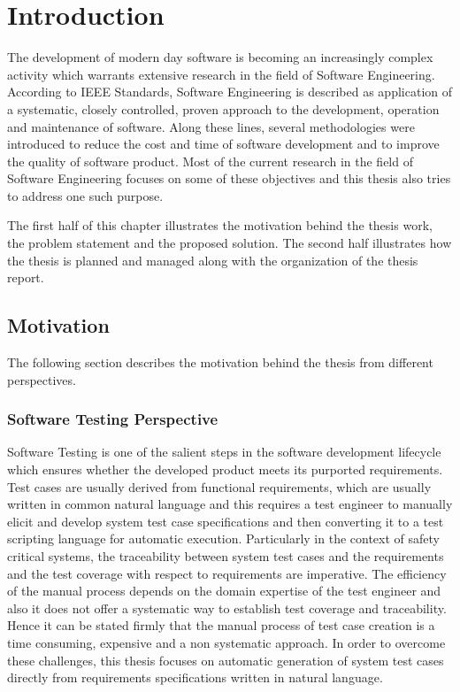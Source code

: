 
\chapter{Introduction}
The development of modern day software is becoming an increasingly complex activity which warrants extensive research in the field of Software Engineering. According to IEEE Standards, Software Engineering is described as application of a systematic, closely controlled, proven approach to the development, operation and maintenance of software. Along these lines, several methodologies were introduced to reduce the cost and time of software development and to improve the quality of software product. Most of the current research in the field of Software Engineering focuses on some of these objectives and this thesis also tries to address one such purpose.

The first half of this chapter illustrates the motivation behind the thesis work, the problem statement and the proposed solution. The second half illustrates how the thesis is planned and managed along with the organization of the thesis report.
\section{Motivation}
The following section describes the motivation behind the thesis from different perspectives.
\subsection{Software Testing Perspective}
Software Testing is one of the salient steps in the software development lifecycle which ensures whether the developed product meets its purported requirements. Test cases are usually derived from functional requirements, which are usually written in common natural language and this requires a test engineer to manually elicit and develop system test case specifications and then converting it to a test scripting language for automatic execution. Particularly in the context of safety critical systems, the traceability between system test cases and the requirements and the test coverage with respect to requirements are imperative. The efficiency of the manual process depends on the domain expertise of the test engineer and also it does not offer a systematic way to establish test coverage and traceability. Hence it can be stated firmly that the manual process of test case creation is a time consuming, expensive and a non systematic approach. In order to overcome these challenges, this thesis focuses on automatic generation of system test cases directly from requirements specifications written in natural language.
